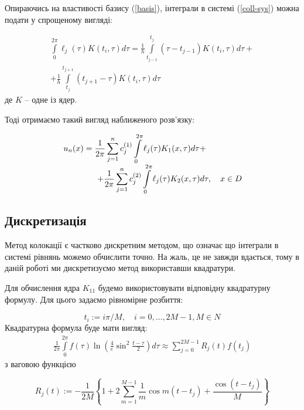 \documentclass[14pt,a4paper]{extarticle}
\newcounter{e}
\numberwithin{equation}{section}
\numberwithin{figure}{section}
\newcommand{\intl}{\int\limits}
\newcommand{\inttwopi}{\intl_{0}^{2\pi}}
\begin{document}
 Опираючись на властивості базису (\ref{basis}), інтеграли в системі (\ref{coll-sys}) можна подати у спрощеному вигляді:
 
 \begin{equation}
 	\begin{matrix}
 	\displaystyle
 	\inttwopi \ell_{j}(\tau) K\left(t_{i}, \tau\right) d \tau=\frac{1}{h} \intl_{t_{j-1}}^{t_{j}}\left(\tau-t_{j-1}\right) K\left(t_{i}, \tau\right) d \tau + \\
 	\displaystyle
 	+\frac{1}{h} \intl_{t_{j}}^{t_{j+1}}\left(t_{j+1}-\tau\right) K\left(t_{i}, \tau\right) d \tau
 	\end{matrix}
 \end{equation}
 де $K$ -- одне із ядер.
 
 Тоді отримаємо такий вигляд наближеного розв'язку:

 \begin{equation}
 	\begin{matrix}
 	\displaystyle
 	\hspace{-1.5cm} u_n(x) = \frac{1}{2 \pi} \sum_{j=1}^{n} c^{(1)}_{j} \inttwopi \ell_{j}(\tau) K_{1}(x, \tau) d \tau + \\
 	\displaystyle
 	\hspace{1.5cm} + \frac{1}{2 \pi} \sum_{j=1}^{n} c^{(2)}_{j} \inttwopi \ell_{j}(\tau) K_{2}(x, \tau) d \tau, \quad x \in D
    \end{matrix}
 \end{equation}
 
 
 \subsection{Дискретизація}
 Метод колокації є частково дискретним методом, що означає що інтеграли в системі рівнянь можемо обчислити точно. На жаль, це не завжди вдається, тому в даній роботі ми дискретизуємо метод використавши квадратури.

Для обчислення ядра $K_{11}$ будемо використовувати відповідну квадратурну формулу. Для цього задаємо рівномірне розбиття:

$$
t_{i}:=i \pi / M, \quad i=0, \ldots, 2 M-1, M \in N
$$
Квадратурна формула буде мати вигляд:
\begin{eqnarray}
	\frac{1}{2 \pi} \inttwopi f(\tau) \ln \left(\frac{4}{e} \sin ^{2} \frac{t-\tau}{2}\right) d \tau \approx \sum_{j=0}^{2 M-1} R_{j}(t) f\left(t_{j}\right)
\end{eqnarray}
з ваговою функцією

\begin{equation}
	R_{j}(t):=-\frac{1}{2 M}\left\{1+2 \sum_{m=1}^{M-1} \frac{1}{m} \cos m\left(t-t_{j}\right)+\frac{\cos \left(t-t_{j}\right)}{M}\right\}
\end{equation} 
\end{document}
